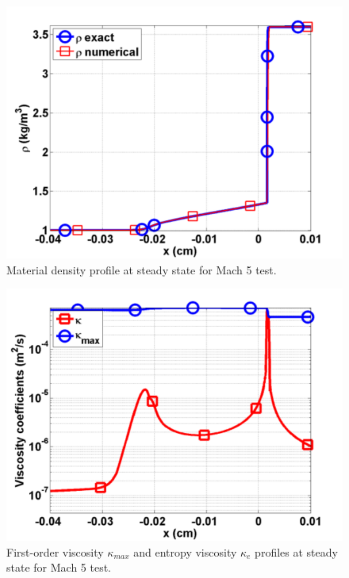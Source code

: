 \documentclass[review]{elsarticle}
\begin{document}
\begin{figure}[H]
                \centering
                \includegraphics[width=\textwidth]{Mach_5_nel_2000_density.png}
        \caption{Material density profile at steady state for Mach 5 test.}\label{fig:Mach5_density}
\end{figure}
\begin{figure}[H]
                \centering
                \includegraphics[width=\textwidth]{Mach_5_nel_2000_viscosity.png}
        \caption{First-order viscosity $\kappa_{max}$ and entropy viscosity $\kappa_e$ profiles at steady state for Mach 5 test.}\label{fig:Mach5_viscosity}
\end{figure}
\end{document}
